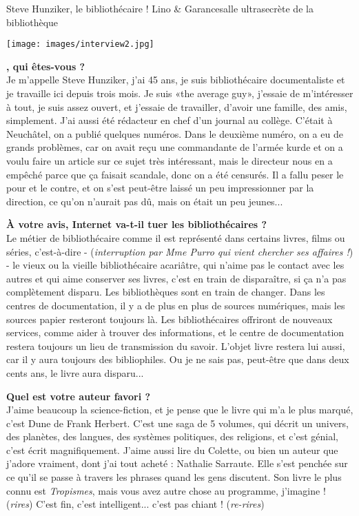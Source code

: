 \vspace*{-1.7cm}
\begin{article}{Steve Hunziker, le bibliothécaire ! }
{Lino \& Garance}{salle ultrasecrète de la bibliothèque}

\texttt{[image: images/interview2.jpg]}

\textbf{, qui êtes-vous ?}\\
Je m'appelle Steve Hunziker, j'ai 45 ans, je suis bibliothécaire documentaliste et je travaille ici depuis trois mois.
Je suis «the average guy», j'essaie de m'intéresser à tout, je suis assez ouvert, et j'essaie de travailler, d'avoir une famille, des amis, simplement. 
J'ai aussi été rédacteur en chef d'un journal au collège. C'était à Neuchâtel, on a publié quelques numéros. Dans le deuxième numéro, on a eu de grands problèmes, car on avait reçu une commandante de l'armée kurde et on a voulu faire un article sur ce sujet très intéressant, mais le directeur nous en a empêché parce que ça faisait scandale, donc on a été censurés. Il a fallu peser le pour et le contre, et on s'est peut-être laissé un peu impressionner par la direction, ce qu'on n'aurait pas dû, mais on était un peu jeunes... 

\textbf{À votre avis, Internet va-t-il tuer les bibliothécaires ?}\\
Le métier de bibliothécaire comme il est représenté dans certains livres, films ou séries, c'est-à-dire - (\textit{interruption par Mme Purro qui vient chercher ses affaires !}) - le vieux ou la vieille bibliothécaire acariâtre, qui n'aime pas le contact avec les autres et qui aime conserver ses livres, c'est en train de disparaître, si ça n'a pas complètement disparu. Les bibliothèques sont en train de changer. Dans les centres de documentation, il y a de plus en plus de sources numériques, mais les sources papier resteront toujours là. Les bibliothécaires offriront de nouveaux services, comme aider à trouver des informations, et le centre de documentation restera toujours un lieu de transmission du savoir. L'objet livre restera lui aussi, car il y aura toujours des bibliophiles. Ou je ne sais pas, peut-être que dans deux cents ans, le livre aura disparu... 


\textbf{Quel est votre auteur favori ?}\\
J'aime beaucoup la science-fiction, et je pense que le livre qui m'a le plus marqué, c'est Dune de Frank Herbert. C'est une saga de 5 volumes, qui décrit un univers, des planètes, des langues, des systèmes politiques, des religions, et c'est génial, c'est écrit magnifiquement. J'aime aussi lire du Colette, ou bien un auteur que j'adore vraiment, dont j'ai tout acheté : Nathalie Sarraute. Elle s'est penchée sur ce qu'il se passe à travers les phrases quand les gens discutent. Son livre le plus connu est \textit{Tropismes}, mais vous avez autre chose au programme, j'imagine ! (\textit{rires}) C'est fin, c'est intelligent... c'est pas chiant ! (\textit{re-rires})


\end{article}
